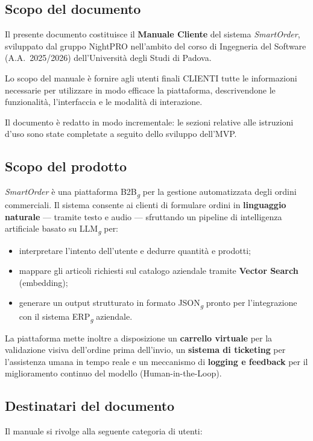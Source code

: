 \subsection{Scopo del documento}
Il presente documento costituisce il \textbf{Manuale Cliente} del sistema \textit{SmartOrder}, sviluppato dal gruppo NightPRO nell'ambito del corso di Ingegneria del Software (A.A.\ 2025/2026) dell'Universit\`a degli Studi di Padova.

Lo scopo del manuale \`e fornire agli utenti finali CLIENTI tutte le informazioni necessarie per utilizzare in modo efficace la piattaforma, descrivendone le funzionalit\`a, l'interfaccia e le modalit\`a di interazione.

Il documento \`e redatto in modo incrementale: le sezioni relative alle istruzioni d'uso sono state completate a seguito dello sviluppo dell'MVP.

\subsection{Scopo del prodotto}
\textit{SmartOrder} \`e una piattaforma B2B\textsubscript{\textit{g}} per la gestione automatizzata degli ordini commerciali. Il sistema consente ai clienti di formulare ordini in \textbf{linguaggio naturale} --- tramite testo e audio --- sfruttando un pipeline di intelligenza artificiale basato su LLM\textsubscript{\textit{g}} per:

\begin{itemize}[noitemsep]
    \item interpretare l'intento dell'utente e dedurre quantit\`a e prodotti;
    \item mappare gli articoli richiesti sul catalogo aziendale tramite \textbf{Vector Search} (embedding);
    \item generare un output strutturato in formato JSON\textsubscript{\textit{g}} pronto per l'integrazione con il sistema ERP\textsubscript{\textit{g}} aziendale.
\end{itemize}

La piattaforma mette inoltre a disposizione un \textbf{carrello virtuale} per la validazione visiva dell'ordine prima dell'invio, un \textbf{sistema di ticketing} per l'assistenza umana in tempo reale e un meccanismo di \textbf{logging e feedback} per il miglioramento continuo del modello (Human-in-the-Loop).

\subsection{Destinatari del documento}
Il manuale si rivolge alla seguente categoria di utenti:

